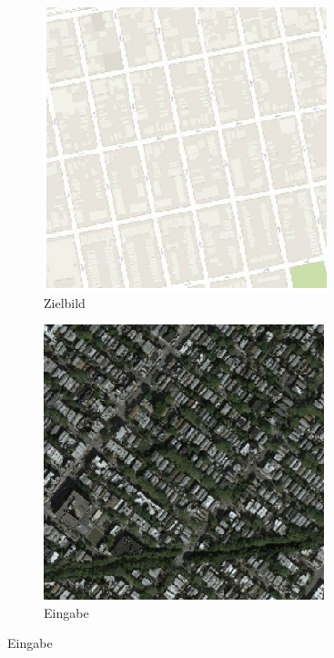 \begin{figure}[ht]
\begin{subfigure}[t]{.14\textwidth}
	\end{subfigure}
	\begin{subfigure}[t]{.14\textwidth}
		\centering
		\caption*{Zielbild}
		\includegraphics[width=\linewidth]{images/Pix2PixResults/Ziel-Bild.png}
	\end{subfigure}
	\hfill
	\begin{subfigure}[t]{.14\textwidth}
		\centering
		\caption*{Eingabe}
		\includegraphics[width=\linewidth]{images/Pix2PixResults/Eingabe-Bild2.png}

\end{subfigure}
\end{figure}
